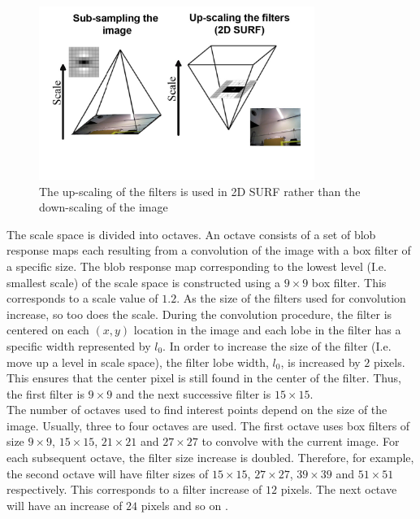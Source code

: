 \documentclass{report}
\begin{document}
\begin{figure}[h!] 
  \centering
    \includegraphics[width=0.8\textwidth]{../Drawings/methods/SURF2D_Image_pyramid.jpg}
    \caption{The up-scaling of the filters is used in 2D SURF rather than the down-scaling of the image}
    \label{fig:scaleSpace}
\end{figure}

The scale space is divided into octaves. An octave consists of a set of blob response maps each resulting from a convolution of the image with a box filter of a specific size. The blob response map corresponding to the lowest level (I.e. smallest scale) of the scale space is constructed using a $9 \times 9$ box filter. This corresponds to a scale value of $1.2$. As the size of the filters used for convolution increase, so too does the scale. During the convolution procedure, the filter is centered on each $(x,y)$ location in the image and each lobe in the filter has a specific width represented by $l_0$. In order to increase the size of the filter (I.e. move up a level in scale space), the filter lobe width, $l_0$, is increased by $2$ pixels. This ensures that the center pixel is still found in the center of the filter. Thus, the first filter is $9 \times 9$ and the next successive filter is $15 \times 15$. \\

The number of octaves used to find interest points depend on the size of the image. Usually, three to four octaves are used. The first octave uses box filters of size $9 \times 9$, $15 \times 15$, $21 \times 21$ and $27 \times 27$ to convolve with the current image.  For each subsequent octave, the filter size increase is doubled. Therefore, for example, the second octave will have filter sizes of $15 \times 15$, $27 \times 27$, $39 \times 39$ and $51 \times 51$ respectively. This corresponds to a filter increase of $12$ pixels. The next octave will have an increase of $24$ pixels and so on \cite{Bay2008}. \\
\end{document}
